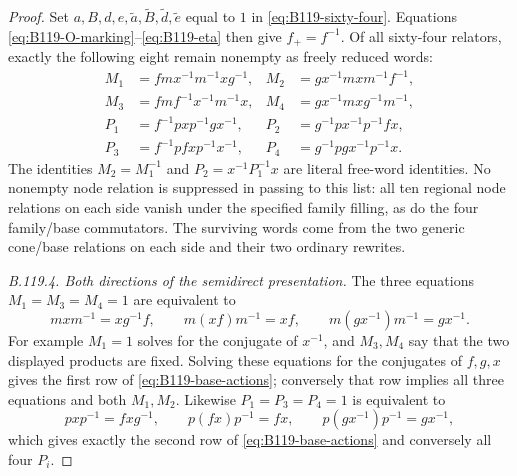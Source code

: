 \begin{proof}
Set $a,B,d,e,\widetilde a,\widetilde B,\widetilde d,
\widetilde e$ equal to $1$ in \eqref{eq:B119-sixty-four}.
Equations \eqref{eq:B119-O-marking}--\eqref{eq:B119-eta} then give
$f_+=f^{-1}$. Of all sixty-four relators, exactly the following
eight remain nonempty as freely reduced words:
\begin{equation}\label{eq:B119-eight-words}
 \begin{aligned}
 M_1&=fmx^{-1}m^{-1}xg^{-1},&
 M_2&=gx^{-1}mxm^{-1}f^{-1},\\
 M_3&=fmf^{-1}x^{-1}m^{-1}x,&
 M_4&=gx^{-1}mxg^{-1}m^{-1},\\
 P_1&=f^{-1}pxp^{-1}gx^{-1},&
 P_2&=g^{-1}px^{-1}p^{-1}fx,\\
 P_3&=f^{-1}pfxp^{-1}x^{-1},&
 P_4&=g^{-1}pgx^{-1}p^{-1}x.
 \end{aligned}
\end{equation}
The identities $M_2=M_1^{-1}$ and
$P_2=x^{-1}P_1^{-1}x$ are literal free-word identities.
No nonempty node relation is suppressed in passing to this list:
all ten regional node relations on each side vanish under the
specified family filling, as do the four family/base commutators.
The surviving words come from the two generic cone/base relations
on each side and their two ordinary rewrites.

\emph{B.119.4. Both directions of the semidirect presentation.}
The three equations $M_1=M_3=M_4=1$ are equivalent to
\begin{equation}\label{eq:B119-m-three}
 mxm^{-1}=xg^{-1}f,\qquad
 m(xf)m^{-1}=xf,\qquad m(gx^{-1})m^{-1}=gx^{-1}.
\end{equation}
For example $M_1=1$ solves for the conjugate of $x^{-1}$,
and $M_3,M_4$ say that the two displayed products are fixed.
Solving these equations for the conjugates of $f,g,x$ gives
the first row of \eqref{eq:B119-base-actions}; conversely that row
implies all three equations and both $M_1,M_2$.
Likewise $P_1=P_3=P_4=1$ is equivalent to
\begin{equation}\label{eq:B119-p-three}
 pxp^{-1}=fxg^{-1},\qquad
 p(fx)p^{-1}=fx,\qquad p(gx^{-1})p^{-1}=gx^{-1},
\end{equation}
which gives exactly the second row of
\eqref{eq:B119-base-actions} and conversely all four $P_i$.


\end{proof}
